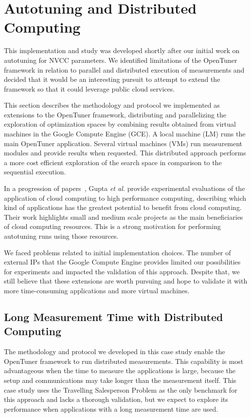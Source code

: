 \section{Autotuning and Distributed Computing}
\label{sec:autotuningCloud}

This implementation and study was developed shortly after our initial work on
autotuning for NVCC parameters. We identified limitations of the OpenTuner
framework in relation to parallel and distributed execution of measurements
and decided that it would be an interesting pursuit to attempt to extend
the framework so that it could leverage public cloud services.

This section describes the methodology and protocol we implemented as
extensions to the OpenTuner framework, distributing and parallelizing the
exploration of optimization spaces by combining results obtained from virtual
machines in the Google Compute Engine (GCE).  A local machine (LM) runs the
main OpenTuner application. Several virtual machines (VMs) run measurement
modules and provide results when requested. This distributed approach performs
a more cost efficient exploration of the search space in comparison to the
sequential execution.

In a progression of
papers~\cite{gupta2012exploring,gupta2014evaluating,gupta2013the}, Gupta
\emph{et al.} provide experimental evaluations of the application of cloud
computing to high performance computing, describing which kind of applications
has the greatest potential to benefit from cloud computing.  Their work
highlights small and medium scale projects as the main beneficiaries of cloud
computing resources. This is a strong motivation for performing autotuning
runs using those resources.

We faced problems related to initial implementation choices. The number of
external IPs that the Google Compute Engine provides limited our possibilities
for experiments and impacted the validation of this approach. Despite that, we
still believe that these extensions are worth pursuing and hope to validate it
with more time-consuming applications and more virtual machines.

\subsection{Long Measurement Time with Distributed Computing}

The methodology and protocol we developed in this case study enable the
OpenTuner framework to run distributed measurements.  This capability is most
advantageous when the time to measure the applications is large, because the
setup and communications may take longer than the measurement itself.  This
case study uses the Travelling Salesperson Problem as the only benchmark for
this approach and lacks a thorough validation, but we expect to explore its
performance when applications with a long measurement time are used.


